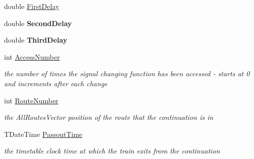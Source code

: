 \begin{DoxyCompactItemize}
\item 
double \mbox{\hyperlink{class_t_train_controller_1_1_t_continuation_auto_sig_entry_ab5a944eed2be17d13d99a9070f78c785}{First\+Delay}}
\item 
\mbox{\label{class_t_train_controller_1_1_t_continuation_auto_sig_entry_a637042cd9aa1c141c68ca1979935c8d8}} 
double {\bfseries Second\+Delay}
\item 
\mbox{\label{class_t_train_controller_1_1_t_continuation_auto_sig_entry_ad393d737f9031743cabfc1fbd1ac6239}} 
double {\bfseries Third\+Delay}
\item 
\mbox{\label{class_t_train_controller_1_1_t_continuation_auto_sig_entry_ae4cf92f0e912fe54c7b9549ba4158e90}} 
int \mbox{\hyperlink{class_t_train_controller_1_1_t_continuation_auto_sig_entry_ae4cf92f0e912fe54c7b9549ba4158e90}{Access\+Number}}
\begin{DoxyCompactList}\small\item\em the number of times the signal changing function has been accessed -\/ starts at 0 and increments after each change \end{DoxyCompactList}\item 
\mbox{\label{class_t_train_controller_1_1_t_continuation_auto_sig_entry_a20f64023350c7394250f784b58a5c036}} 
int \mbox{\hyperlink{class_t_train_controller_1_1_t_continuation_auto_sig_entry_a20f64023350c7394250f784b58a5c036}{Route\+Number}}
\begin{DoxyCompactList}\small\item\em the All\+Routes\+Vector position of the route that the continuation is in \end{DoxyCompactList}\item 
\mbox{\label{class_t_train_controller_1_1_t_continuation_auto_sig_entry_a658b7d6efd311690bb9c36e3518e3ff5}} 
T\+Date\+Time \mbox{\hyperlink{class_t_train_controller_1_1_t_continuation_auto_sig_entry_a658b7d6efd311690bb9c36e3518e3ff5}{Passout\+Time}}
\begin{DoxyCompactList}\small\item\em the timetable clock time at which the train exits from the continuation \end{DoxyCompactList}\end{DoxyCompactItemize}


